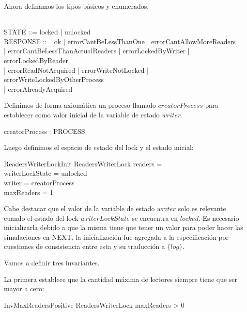 \documentclass[a4paper, 12pt]{article}
\begin{document}
Ahora definamos los tipos básicos y enumerados.
\begin{zed}
[PROCESS] \\
\also
STATE ::= locked | unlocked\\
\also
RESPONSE ::= ok | errorCantBeLessThanOne | errorCantAllowMoreReaders \\ 
| errorCantBeLessThanActualReaders | errorLockedByWriter | errorLockedByReader \\
| errorReadNotAcquired | errorWriteNotLocked | errorWriteLockedByOtherProcess \\
| errorAlreadyAcquired  
\end{zed}

Definimos de forma axiomática un proceso llamado $creatorProcess$ para establecer como valor inicial de la variable de estado $writer$.

\begin{axdef}
creatorProcess : PROCESS
\end{axdef}

Luego definimos el espacio de estado del lock y el estado inicial:

\begin{schema}{ReadersWriterLockInit}
    ReadersWriterLock
\where
    readers = \emptyset \\
    writerLockState = unlocked \\
    writer = creatorProcess \\
    maxReaders = 1
\end{schema}

Cabe destacar que el valor de la variable de estado $writer$ solo es relevante cuando el estado del lock $writerLockState$ se encuentra en $locked$. Es necesario inicializarla debido a que la misma tiene que tener un valor para poder hacer las simulaciones en NEXT, la inicialización fue agregada a la especificación por cuestiones de consistencia entre esta y su traducción a $\{log\}$.

Vamos a definir tres invariantes. 

La primera establece que la cantidad máxima de lectores siempre tiene que ser mayor a cero:

\begin{schema}{InvMaxReadersPositive}
    ReadersWriterLock
\where
    maxReaders > 0
\end{schema}
\end{document}

